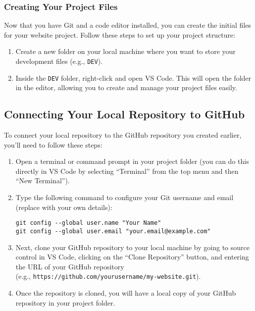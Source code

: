 \subsubsection{Creating Your Project Files}
Now that you have Git and a code editor installed, you can create the initial files for your website project. Follow these steps to set up your project structure:
\begin{enumerate}
    \item Create a new folder on your local machine where you want to store your development files (e.g., \texttt{DEV}).
    \item Inside the \texttt{DEV} folder, right-click and open VS Code. This will open the folder in the editor, allowing you to create and manage your project files easily.
\end{enumerate}


\subsection{Connecting Your Local Repository to GitHub}
To connect your local repository to the GitHub repository you created earlier, you'll need to follow these steps:
\begin{enumerate}
    \item Open a terminal or command prompt in your project folder (you can do this directly in VS Code by selecting ``Terminal'' from the top menu and then ``New Terminal'').
    \item Type the following command to configure your Git username and email (replace with your own details):
    \begin{verbatim}
git config --global user.name "Your Name"
git config --global user.email "your.email@example.com"
\end{verbatim}
    \item Next, clone your GitHub repository to your local machine by going to source control in VS Code, clicking on the ``Clone Repository'' button, and entering the URL of your GitHub repository \\ (e.g., \texttt{https://github.com/yourusername/my-website.git}).
    \item Once the repository is cloned, you will have a local copy of your GitHub repository in your project folder.
\end{enumerate}
